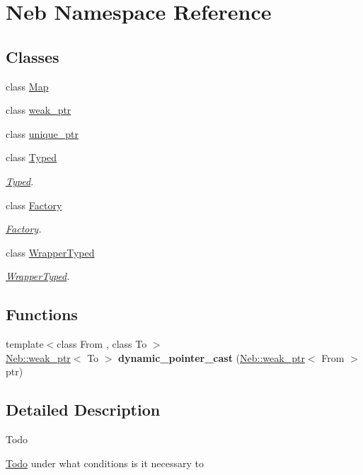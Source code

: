 \hypertarget{namespaceNeb}{\section{\-Neb \-Namespace \-Reference}
\label{namespaceNeb}
}
\subsection*{\-Classes}
\begin{DoxyCompactItemize}
\item 
class \hyperlink{classNeb_1_1Map}{\-Map}
\item 
class \hyperlink{classNeb_1_1weak__ptr}{weak\-\_\-ptr}
\item 
class \hyperlink{classNeb_1_1unique__ptr}{unique\-\_\-ptr}
\item 
class \hyperlink{classNeb_1_1Typed}{\-Typed}
\begin{DoxyCompactList}\small\item\em \hyperlink{classNeb_1_1Typed}{\-Typed}. \end{DoxyCompactList}\item 
class \hyperlink{classNeb_1_1Factory}{\-Factory}
\begin{DoxyCompactList}\small\item\em \hyperlink{classNeb_1_1Factory}{\-Factory}. \end{DoxyCompactList}\item 
class \hyperlink{classNeb_1_1WrapperTyped}{\-Wrapper\-Typed}
\begin{DoxyCompactList}\small\item\em \hyperlink{classNeb_1_1WrapperTyped}{\-Wrapper\-Typed}. \end{DoxyCompactList}\end{DoxyCompactItemize}
\subsection*{\-Functions}
\begin{DoxyCompactItemize}
\item 
\hypertarget{namespaceNeb_a4ed152a7fe9e22a11580d60f1d14b2d2}{{\footnotesize template$<$class From , class To $>$ }\\\hyperlink{classNeb_1_1weak__ptr}{\-Neb\-::weak\-\_\-ptr}$<$ \-To $>$ {\bfseries dynamic\-\_\-pointer\-\_\-cast} (\hyperlink{classNeb_1_1weak__ptr}{\-Neb\-::weak\-\_\-ptr}$<$ \-From $>$ ptr)}\label{namespaceNeb_a4ed152a7fe9e22a11580d60f1d14b2d2}

\end{DoxyCompactItemize}


\subsection{\-Detailed \-Description}
\begin{DoxyRefDesc}{\-Todo}
\item[\hyperlink{todo__todo000003}{\-Todo}]under what conditions is it necessary to \end{DoxyRefDesc}
